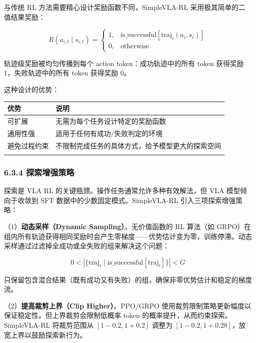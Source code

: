 \documentclass[
  chinese,
]{ctexart}
\begin{document}
与传统 RL 方法需要精心设计奖励函数不同，SimpleVLA-RL
采用极其简单的二值结果奖励：

\[
R(a_{i,t} \mid s_{i,t}) = \begin{cases} 1, & \text{is\_successful}[\text{traj}_i(a_i, s_i)] \\ 0, & \text{otherwise} \end{cases}
\]

轨迹级奖励被均匀传播到每个 action token：成功轨迹中的所有 token 获得奖励
1，失败轨迹中的所有 token 获得奖励 0。

这种设计的优势：

\begin{center}
\begin{tabular}{@{}>{\raggedright\arraybackslash}p{} >{\raggedright\arraybackslash}p{}@{}}
\toprule\noalign{}
优势 & 说明 \\
\midrule\noalign{}
可扩展 & 无需为每个任务设计特定的奖励函数 \\
通用性强 & 适用于任何有成功/失败判定的环境 \\
避免过程约束 & 不限制完成任务的具体方式，给予模型更大的探索空间 \\
\bottomrule\noalign{}
\end{tabular}
\end{center}

\subsubsection{6.3.4
探索增强策略}\label{ux63a2ux7d22ux589eux5f3aux7b56ux7565}

探索是 VLA RL 的关键瓶颈。操作任务通常允许多种有效解法，但 VLA
模型倾向于收敛到 SFT 数据中的少数固定模式。SimpleVLA-RL
引入三项探索增强策略：

（1）\textbf{动态采样（Dynamic Sampling）}。无价值函数的 RL 算法（如
GRPO）在组内所有轨迹获得相同奖励时会产生零梯度------优势估计变为零，训练停滞。动态采样通过过滤掉全成功或全失败的组来解决这个问题：

\[
0 < \left| \{\text{traj}_i \mid \text{is\_successful}[\text{traj}_i]\} \right| < G
\]

只保留包含混合结果（既有成功又有失败）的组，确保非零优势估计和稳定的梯度流。

（2）\textbf{提高裁剪上界（Clip Higher）}。PPO/GRPO
使用裁剪限制策略更新幅度以保证稳定性。但上界裁剪会限制低概率 token
的概率提升，从而约束探索。SimpleVLA-RL 将裁剪范围从 \([1-0.2, 1+0.2]\)
调整为 \([1-0.2, 1+0.28]\)，放宽上界以鼓励探索新行为。
\end{document}
